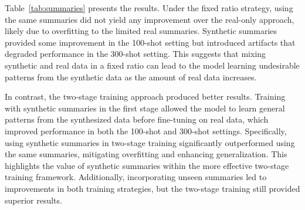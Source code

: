 Table~\ref{tab:summaries} presents the results. Under the fixed ratio strategy, using the same summaries did not yield any improvement over the real-only approach, likely due to overfitting to the limited real summaries. Synthetic summaries provided some improvement in the 100-shot setting but introduced artifacts that degraded performance in the 300-shot setting. This suggests that mixing synthetic and real data in a fixed ratio can lead to the model learning undesirable patterns from the synthetic data as the amount of real data increases.



In contrast, the two-stage training approach produced better results. Training with synthetic summaries in the first stage allowed the model to learn general patterns from the synthesized data before fine-tuning on real data, which improved performance in both the 100-shot and 300-shot settings. Specifically, using synthetic summaries in two-stage training significantly outperformed using the same summaries, mitigating overfitting and enhancing generalization. This highlights the value of synthetic summaries within the more effective two-stage training framework.
Additionally, incorporating unseen summaries led to improvements in both training strategies, but the two-stage training still provided superior results. 





